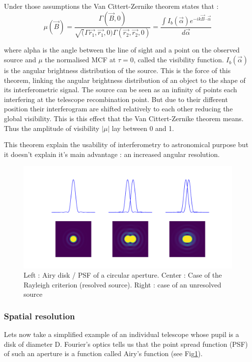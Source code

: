Under those assumptions the Van Cittert-Zernike theorem states that :
$$
\mu(\vec{B}) = \frac{\Gamma(\vec{B},0)}{\sqrt(\Gamma{\vec{r_1},\vec{r_1},0)\Gamma(\vec{r_2},\vec{r_2},0)}} = \frac{\int I_b(\vec{\alpha}) e^{-ik\vec{B} \cdot \vec{\alpha}}}{d\vec{\alpha}}
$$

where alpha is the angle between the line of sight and a point on the observed source and $\mu$ the normalised MCF at $\tau=0$, called the visibility function. $I_b(\vec{\alpha})$ is the angular brightness distribution of the source. This is the force of this theorem, linking the angular brightness distribution of an object to the shape of its interferometric signal. The source can be seen as an infinity of points each interfering at the telescope recombination point. But due to their different position their interferogram are shifted relatively to each other reducing the global visibility. This is this effect that the Van Cittert-Zernike theorem means. Thus the amplitude of visibility $\left| \mu \right|$ lay between 0 and 1.

This theorem explain the usability of interferometry to astronomical purpose but it doesn't explain it's main advantage : an increased angular resolution. 

\begin{figure}[htbp!]
\centering
\includegraphics[scale=.3]{../picture/airy.pdf}
\caption{Left : Airy disk / PSF of a circular aperture. Center : Case of the Rayleigh criterion (resolved source). Right : case of an unresolved source}
\label{fig:airy}
\end{figure}

	\subsubsection{Spatial resolution}
Lets now take a simplified example of an individual telescope whose pupil is a disk of diameter D. Fourier's optics tells us that the point spread function (PSF) of such an aperture is a function called Airy's function (see Fig\ref{fig:airy}). 


